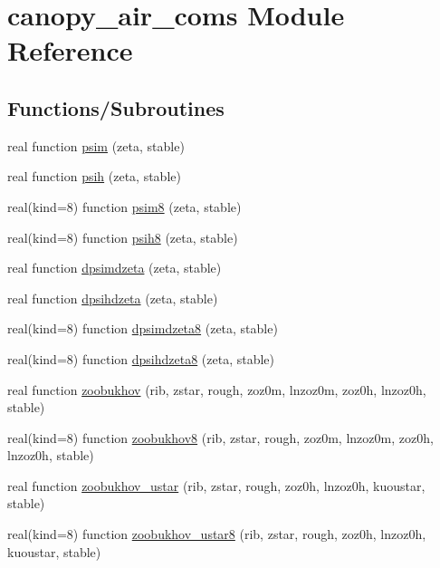 \hypertarget{namespacecanopy__air__coms}{}\section{canopy\+\_\+air\+\_\+coms Module Reference}
\label{namespacecanopy__air__coms}
\subsection*{Functions/\+Subroutines}
\begin{DoxyCompactItemize}
\item 
real function \hyperlink{namespacecanopy__air__coms_ab103fa081460babbe04c9a5a4699be5f}{psim} (zeta, stable)
\item 
real function \hyperlink{namespacecanopy__air__coms_acedb0f66db4b79009a69e87c5fd3ed71}{psih} (zeta, stable)
\item 
real(kind=8) function \hyperlink{namespacecanopy__air__coms_aba7cbe776dbfa9815870ad3686949041}{psim8} (zeta, stable)
\item 
real(kind=8) function \hyperlink{namespacecanopy__air__coms_aef33f0eeea82151a8edb6dc38c4cc921}{psih8} (zeta, stable)
\item 
real function \hyperlink{namespacecanopy__air__coms_af8bc6f1d6999a4b614461cecb85c9b1b}{dpsimdzeta} (zeta, stable)
\item 
real function \hyperlink{namespacecanopy__air__coms_a64552e0380fcb36366b5eb0f624241a3}{dpsihdzeta} (zeta, stable)
\item 
real(kind=8) function \hyperlink{namespacecanopy__air__coms_a51b006ac118f9549aee23ddb61a1bf19}{dpsimdzeta8} (zeta, stable)
\item 
real(kind=8) function \hyperlink{namespacecanopy__air__coms_aa5f9649efc40a05ddc13e1450f30fad3}{dpsihdzeta8} (zeta, stable)
\item 
real function \hyperlink{namespacecanopy__air__coms_a6062471b3381c283205ea8b27383a5e0}{zoobukhov} (rib, zstar, rough, zoz0m, lnzoz0m, zoz0h, lnzoz0h, stable)
\item 
real(kind=8) function \hyperlink{namespacecanopy__air__coms_afef697305b4b30385c5206f48d9e787c}{zoobukhov8} (rib, zstar, rough, zoz0m, lnzoz0m, zoz0h, lnzoz0h, stable)
\item 
real function \hyperlink{namespacecanopy__air__coms_a5251266695c581c8f4058d98f6c86200}{zoobukhov\+\_\+ustar} (rib, zstar, rough, zoz0h, lnzoz0h, kuoustar, stable)
\item 
real(kind=8) function \hyperlink{namespacecanopy__air__coms_a6ef582f46fded1355973730e6a2289f2}{zoobukhov\+\_\+ustar8} (rib, zstar, rough, zoz0h, lnzoz0h, kuoustar, stable)
\end{DoxyCompactItemize}
